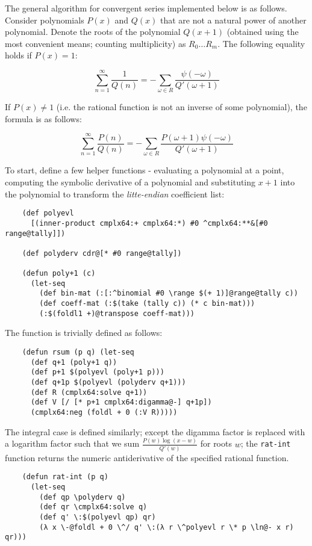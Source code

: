 The general algorithm for convergent series implemented below is as follows. Consider polynomials $P(x)$ and $Q(x)$ that are not a natural power of another polynomial. Denote the roots of the polynomial $Q(x+1)$ (obtained using the most convenient means; counting multiplicity) as $R_0 \dots R_m$. The following equality holds if $P(x)=1$:

$$
\sum_{n=1}^\infty \frac{1}{Q(n)} = -\sum_{\omega \in R} \frac{\psi(-\omega)}{Q'(\omega + 1)}
$$

If $P(x) \ne 1$ (i.e. the rational function is not an inverse of some polynomial), the formula is as follows:

$$
\sum_{n=1}^\infty \frac{P(n)}{Q(n)} = -\sum_{\omega \in R} \frac{P(\omega + 1) \psi(-\omega)}{Q'(\omega + 1)}
$$

To start, define a few helper functions - evaluating a polynomial at a point, computing the symbolic derivative of a polynomial and substituting $x+1$ into the polynomial to transform the \textit{litte-endian} coefficient list:

\begin{Verbatim}
    (def polyevl
      [(inner-product cmplx64:+ cmplx64:*) #0 ^cmplx64:**&[#0 range@tally]])

    (def polyderv cdr@[* #0 range@tally])

    (defun poly+1 (c)
      (let-seq
        (def bin-mat (:[:^binomial #0 \range $(+ 1)]@range@tally c))
        (def coeff-mat (:$(take (tally c)) (* c bin-mat)))
        (:$(foldl1 +)@transpose coeff-mat)))
\end{Verbatim}

The function is trivially defined as follows:

\begin{Verbatim}
    (defun rsum (p q) (let-seq
      (def q+1 (poly+1 q))
      (def p+1 $(polyevl (poly+1 p)))
      (def q+1p $(polyevl (polyderv q+1)))
      (def R (cmplx64:solve q+1))
      (def V [/ [* p+1 cmplx64:digamma@-] q+1p])
      (cmplx64:neg (foldl + 0 (:V R)))))
\end{Verbatim}

The integral case is defined similarly; except the digamma factor is replaced with a logarithm factor such that we sum $\displaystyle \frac{P(w) \log(x-w)}{Q'(w)}$ for roots $w$; the \verb|rat-int| function returns the numeric antiderivative of the specified rational function. 

\begin{Verbatim}
    (defun rat-int (p q)
      (let-seq
        (def qp \polyderv q)
        (def qr \cmplx64:solve q)
        (def q' \:$(polyevl qp) qr)
        (λ x \-@foldl + 0 \^/ q' \:(λ r \^polyevl r \* p \ln@- x r) qr)))
\end{Verbatim}

